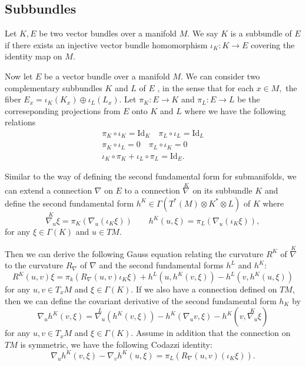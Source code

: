 \subsection{Subbundles}

\begin{definition}
    Let $K, E$ be two vector bundles over a manifold $M$. We say $K$ is a subbundle of $E$ if there exists an injective vector bundle homomorphism $\iota_K : K \to E$ covering the identity map on $M$.
\end{definition}

Now let $E$ be a vector bundle over a manifold $M$. We can consider two complementary subbundles $K$ and $L$ of $E$ , in the sense that for each $x \in M,$ the fiber $E_x=\iota_K(K_x) \oplus \iota_L(L_x)$. Let $\pi _K : E \to K$ and $\pi _L : E \to L$ be the correseponding projections from $E$ onto $K$ and $L$ where we have the following relations
\begin{gather*}
    \pi _K \circ \iota _K= \mathrm{Id}_K \quad \pi _L \circ \iota _L=\mathrm{Id}_L\\
    \pi _K \circ \iota _L=0 \quad \pi _L \circ \iota _K=0\\
    \iota _K \circ \pi _K + \iota _L \circ \pi _L = \mathrm{Id}_E.
\end{gather*}

Similar to the way of defining the second fundamental form for submanifolds, we can extend a connection $\nabla$  on $E$ to a connection $\overset{K}{\nabla_{}} $ on its subbundle $K$ and define the second fundamental form $h^K \in \Gamma (T^*(M) \otimes K^* \otimes L)$ of $K$ where
\begin{equation}
    \overset{K}{\nabla_{u}} \xi = \pi _K(\nabla_{u}^{} (\iota _K \xi )) \qquad 
    h^K(u,\xi )=\pi _L(\nabla_{u}^{} (\iota _K \xi )),
\end{equation}
for any $\xi \in \Gamma (K)$ and $u \in TM.$

Then we can derive the following Gauss equation relating the curvature $R^K$ of $\overset{K}{\nabla_{}} $ to the curvature $R_{\nabla }$ of $\nabla $ and the second fundamental forms $h^L$ and $h^K$:
\begin{equation}
    R^K(u,v)\xi = \pi _k(R_{\nabla }(u,v)\iota _K \xi )+h^L(u,h^K(v,\xi ))-h^L(v,h^K(u,\xi ))
\end{equation} 
for any $u,v \in T_xM$ and $\xi \in \Gamma (K)$. If we also have a connection defined on $TM $, then we can define the covariant derivative of the second fundamental form $h_K$ by 
\begin{equation}
    \nabla_{u}^{} h^K(v,\xi) = \overset{L}{\nabla_{u}} (h^K(v,\xi ))-h^K(\nabla_{u}^{} v,\xi )-h^K(v, \overset{K}{\nabla_{u}} \xi )
\end{equation}
for any $u,v \in T_xM$ and $\xi \in \Gamma (K)$. Assume in addition that the connection on $TM $ is symmetric, we have the following Codazzi identity:
\begin{equation} \label{Codazzi}
    \nabla_{u}^{} h^K(v, \xi )-  \nabla_{v}^{} h^K(u, \xi ) =\pi _L(R_{\nabla }(u,v)(\iota _K \xi )).
\end{equation}

